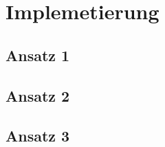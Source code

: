 \section{Implemetierung}\label{sec:Implementierung}
\subsection{Ansatz 1}
\subsection{Ansatz 2}
\subsection{Ansatz 3}
